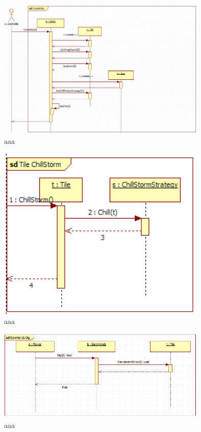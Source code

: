\begin{figure}[H]
	\begin{center}
		\includegraphics[width=10cm]{chapters/chapter03/seqdiag/Game_CreateSea.png}
		\caption{aaa}
		\label{bbb}
	\end{center}
\end{figure}
\begin{figure}[H]
	\begin{center}
		\includegraphics[width=10cm]{chapters/chapter03/seqdiag/Tile_ChillStorm.png}
		\caption{aaa}
		\label{bbb}
	\end{center}
\end{figure}
\begin{figure}[H]
	\begin{center}
		\includegraphics[width=10cm]{chapters/chapter03/seqdiag/BareHandsDig_Dig.png}
		\caption{aaa}
		\label{bbb}
	\end{center}
\end{figure}
